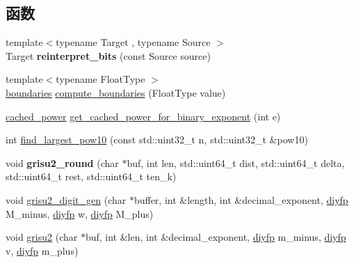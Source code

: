 \subsection*{函数}
\begin{DoxyCompactItemize}
\item 
\mbox{\label{namespacenlohmann_1_1detail_1_1dtoa__impl_a1c5d30eb51e5e994a3f48bde104d2ce8}} 
{\footnotesize template$<$typename Target , typename Source $>$ }\\Target {\bfseries reinterpret\+\_\+bits} (const Source source)
\item 
{\footnotesize template$<$typename Float\+Type $>$ }\\\mbox{\hyperlink{structnlohmann_1_1detail_1_1dtoa__impl_1_1boundaries}{boundaries}} \mbox{\hyperlink{namespacenlohmann_1_1detail_1_1dtoa__impl_a22b6e37654ac93c6d0d9c06ec1bf5ded}{compute\+\_\+boundaries}} (Float\+Type value)
\item 
\mbox{\hyperlink{structnlohmann_1_1detail_1_1dtoa__impl_1_1cached__power}{cached\+\_\+power}} \mbox{\hyperlink{namespacenlohmann_1_1detail_1_1dtoa__impl_adbf329a18c5cf854a3477327afd2200b}{get\+\_\+cached\+\_\+power\+\_\+for\+\_\+binary\+\_\+exponent}} (int e)
\item 
int \mbox{\hyperlink{namespacenlohmann_1_1detail_1_1dtoa__impl_a36ded358763b5dbcea9867660fbe4e28}{find\+\_\+largest\+\_\+pow10}} (const std\+::uint32\+\_\+t n, std\+::uint32\+\_\+t \&pow10)
\item 
\mbox{\label{namespacenlohmann_1_1detail_1_1dtoa__impl_a5bc841e0bee12fd6489d49cf7bd07bb4}} 
void {\bfseries grisu2\+\_\+round} (char $\ast$buf, int len, std\+::uint64\+\_\+t dist, std\+::uint64\+\_\+t delta, std\+::uint64\+\_\+t rest, std\+::uint64\+\_\+t ten\+\_\+k)
\item 
void \mbox{\hyperlink{namespacenlohmann_1_1detail_1_1dtoa__impl_a9b899c72b0e1e3dd46d75c2b4e6bcdfb}{grisu2\+\_\+digit\+\_\+gen}} (char $\ast$buffer, int \&length, int \&decimal\+\_\+exponent, \mbox{\hyperlink{structnlohmann_1_1detail_1_1dtoa__impl_1_1diyfp}{diyfp}} M\+\_\+minus, \mbox{\hyperlink{structnlohmann_1_1detail_1_1dtoa__impl_1_1diyfp}{diyfp}} w, \mbox{\hyperlink{structnlohmann_1_1detail_1_1dtoa__impl_1_1diyfp}{diyfp}} M\+\_\+plus)
\item 
void \mbox{\hyperlink{namespacenlohmann_1_1detail_1_1dtoa__impl_a05b681dcb8569b9784c6dccfadb01633}{grisu2}} (char $\ast$buf, int \&len, int \&decimal\+\_\+exponent, \mbox{\hyperlink{structnlohmann_1_1detail_1_1dtoa__impl_1_1diyfp}{diyfp}} m\+\_\+minus, \mbox{\hyperlink{structnlohmann_1_1detail_1_1dtoa__impl_1_1diyfp}{diyfp}} v, \mbox{\hyperlink{structnlohmann_1_1detail_1_1dtoa__impl_1_1diyfp}{diyfp}} m\+\_\+plus)

\end{DoxyCompactItemize}
